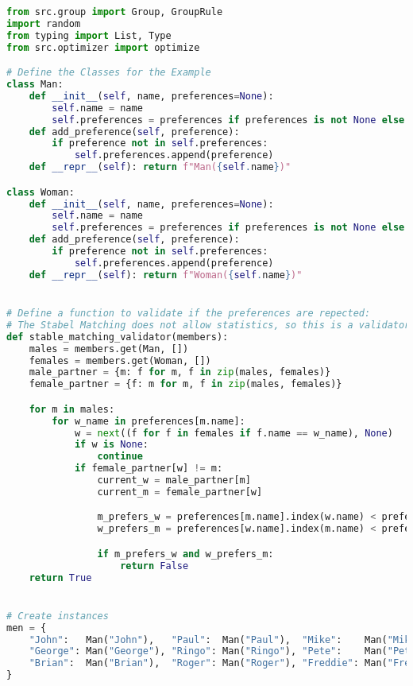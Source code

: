 \begin{lstlisting}[language=Python, caption={Creating and solving the Stable Marriage Problem using this framework.}, label={script:stable_marriage}]
from src.group import Group, GroupRule
import random
from typing import List, Type
from src.optimizer import optimize

# Define the Classes for the Example
class Man:
    def __init__(self, name, preferences=None):
        self.name = name
        self.preferences = preferences if preferences is not None else []
    def add_preference(self, preference):
        if preference not in self.preferences:
            self.preferences.append(preference)
    def __repr__(self): return f"Man({self.name})"

class Woman:
    def __init__(self, name, preferences=None):
        self.name = name
        self.preferences = preferences if preferences is not None else []
    def add_preference(self, preference):
        if preference not in self.preferences:
            self.preferences.append(preference)
    def __repr__(self): return f"Woman({self.name})"


# Define a function to validate if the preferences are repected:
# The Stabel Matching does not allow statistics, so this is a validator function.
def stable_matching_validator(members):
    males = members.get(Man, [])
    females = members.get(Woman, [])
    male_partner = {m: f for m, f in zip(males, females)}
    female_partner = {f: m for m, f in zip(males, females)}

    for m in males:
        for w_name in preferences[m.name]:
            w = next((f for f in females if f.name == w_name), None)
            if w is None:
                continue
            if female_partner[w] != m:
                current_w = male_partner[m]
                current_m = female_partner[w]

                m_prefers_w = preferences[m.name].index(w.name) < preferences[m.name].index(current_w.name)
                w_prefers_m = preferences[w.name].index(m.name) < preferences[w.name].index(current_m.name)

                if m_prefers_w and w_prefers_m:
                    return False
    return True


# Create instances
men = {
    "John":   Man("John"),   "Paul":  Man("Paul"),  "Mike":    Man("Mike"),
    "George": Man("George"), "Ringo": Man("Ringo"), "Pete":    Man("Pete"),
    "Brian":  Man("Brian"),  "Roger": Man("Roger"), "Freddie": Man("Freddie")
}


\end{lstlisting}

